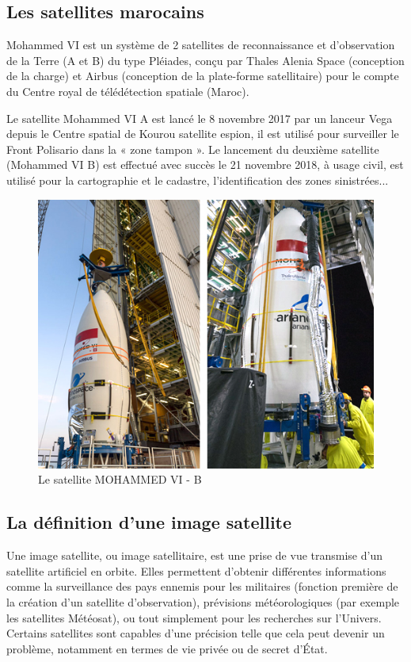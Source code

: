 \documentclass[12pt, openany]{report}
\begin{document}
\subsection{Les satellites marocains}
Mohammed VI est un système de 2 satellites de reconnaissance et d'observation de la Terre (A et B) du type Pléiades, conçu par Thales Alenia Space (conception de la charge) et Airbus (conception de la plate-forme satellitaire) pour le compte du Centre royal de télédétection spatiale (Maroc).
\par
Le satellite Mohammed VI A est lancé le 8 novembre 2017 par un lanceur Vega depuis le Centre spatial de Kourou satellite espion, il est utilisé pour surveiller le Front Polisario dans la « zone tampon ».
Le lancement du deuxième satellite (Mohammed VI B) est effectué avec succès le 21 novembre 2018, à usage civil, est utilisé pour la cartographie et le cadastre, l’identification des zones sinistrées...
\begin{figure}[h]
\centering
\includegraphics[scale=0.8]{satm6.jpg}
\caption{Le satellite MOHAMMED VI - B}
\end{figure}


\subsection{La définition d'une image satellite}
Une image satellite, ou image satellitaire, est une prise de vue transmise d'un satellite artificiel en orbite. Elles permettent d'obtenir différentes informations comme la surveillance des pays ennemis pour les militaires (fonction première de la création d'un satellite d'observation), prévisions météorologiques (par exemple les satellites Météosat), ou tout simplement pour les recherches sur l'Univers. Certains satellites sont capables d'une précision telle que cela peut devenir un problème, notamment en termes de vie privée ou de secret d'État. 
\end{document}

